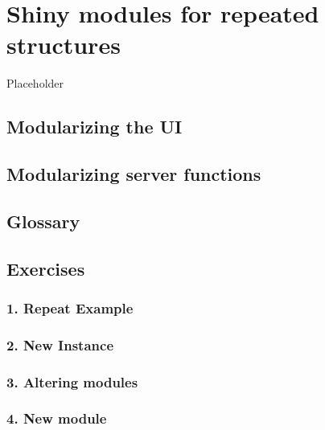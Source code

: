 \documentclass[
]{book}
\begin{document}
\hypertarget{modules}{%
\chapter{Shiny modules for repeated structures}\label{modules}}

Placeholder

\hypertarget{modularizing-the-ui}{%
\section{Modularizing the UI}\label{modularizing-the-ui}}

\hypertarget{modularizing-server-functions}{%
\section{Modularizing server functions}\label{modularizing-server-functions}}

\hypertarget{glossary-modules}{%
\section{Glossary}\label{glossary-modules}}

\hypertarget{exercises-modules}{%
\section{Exercises}\label{exercises-modules}}

\hypertarget{repeat-example}{%
\subsection{1. Repeat Example}\label{repeat-example}}

\hypertarget{new-instance}{%
\subsection{2. New Instance}\label{new-instance}}

\hypertarget{altering-modules}{%
\subsection{3. Altering modules}\label{altering-modules}}

\hypertarget{new-module}{%
\subsection{4. New module}\label{new-module}}
\end{document}
